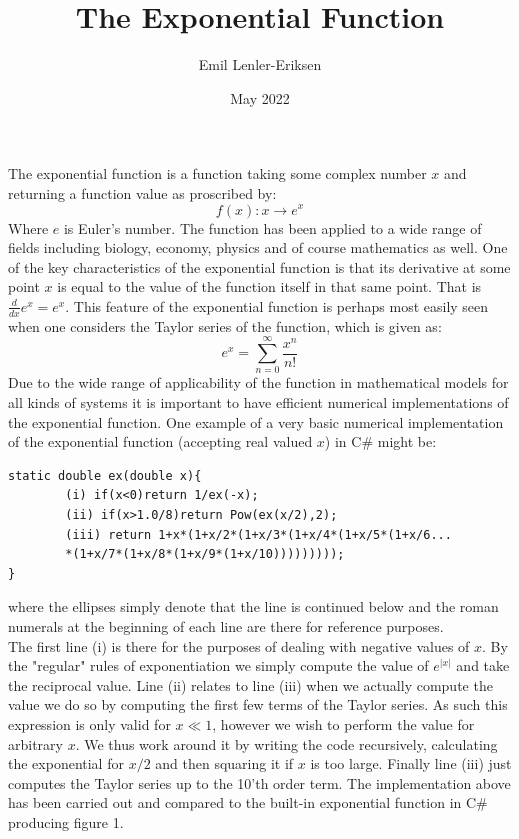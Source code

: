 \documentclass{article}
\title{The Exponential Function}
\author{Emil Lenler-Eriksen}
\date{May 2022}
\begin{document}
\maketitle
The exponential function is a function taking some complex number $x$ and returning a function value as proscribed by: $$f(x) : x \rightarrow e^x $$
Where $e$ is Euler's number. The function has been applied to a wide range of fields including biology, economy, physics and of course mathematics as well. One of the key characteristics of the exponential function is that its derivative at some point $x$ is equal to the value of the function itself in that same point. That is $\frac{d}{dx}e^x = e^x$. This feature of the exponential function is perhaps most easily seen when one considers the Taylor series of the function, which is given as:
\begin{equation}
    e^x = \sum_{n = 0}^\infty \frac{x^n}{n!}
\end{equation}
Due to the wide range of applicability of the function in mathematical models for all kinds of systems it is important to have efficient numerical implementations of the exponential function. One example of a very basic numerical implementation of the exponential function (accepting real valued $x$) in C\# might be:
\begin{lstlisting}
static double ex(double x){
        (i) if(x<0)return 1/ex(-x);
        (ii) if(x>1.0/8)return Pow(ex(x/2),2);
        (iii) return 1+x*(1+x/2*(1+x/3*(1+x/4*(1+x/5*(1+x/6...
        *(1+x/7*(1+x/8*(1+x/9*(1+x/10)))))))));
}
\end{lstlisting}
where the ellipses simply denote that the line is continued below and the roman numerals at the beginning of each line are there for reference purposes.\\
The first line (i) is there for the purposes of dealing with negative values of $x$. By the "regular" rules of exponentiation we simply compute the value of $e^{\vert x \vert}$ and take the reciprocal value. Line (ii) relates to line (iii) when we actually compute the value we do so by computing the first few terms of the Taylor series. As such this expression is only valid for $x\ll1$, however we wish to perform the value for arbitrary $x$. We thus work around it by writing the code recursively, calculating the exponential for $x/2$ and then squaring it if $x$ is too large. Finally line (iii) just computes the Taylor series up to the 10'th order term.
The implementation above has been carried out and compared to the built-in exponential function in C\# producing figure 1.\\
\end{document}
